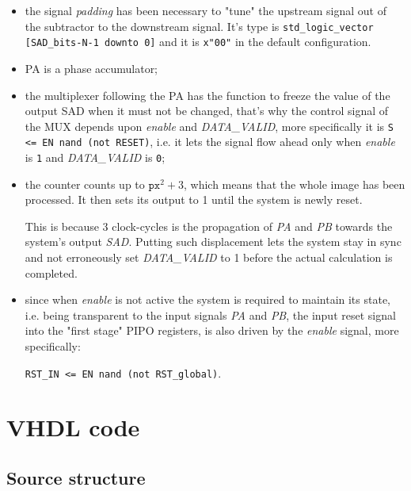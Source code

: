 \documentclass[12pt, a4paper]{article}
\begin{document}
\begin{itemize} 


\item the signal \textit{padding} has been necessary to "tune" the upstream signal out of the subtractor to the downstream signal. It's type is \texttt{std\_logic\_vector [SAD\_bits-N-1 downto 0]} and it is \texttt{x"00"} in the default configuration.

\item PA is a phase accumulator;

\item the multiplexer following the PA has the function to freeze the value of the output SAD when it must not be changed, that's why the control signal of the MUX depends upon \textit{enable} and \textit{DATA\_VALID}, more specifically it is
 \texttt{S <= EN nand (not RESET)}, i.e. it lets the signal flow ahead only when \textit{enable} is \texttt{1} and \textit{DATA\_VALID} is \texttt{0};
 
 \item the counter counts up to $\texttt{px}^2+3$, which means that the whole image has been processed. It then sets its output to 1 until the system is newly reset. 
 
 This is because 3 clock-cycles is the propagation of \textit{PA} and \textit{PB} towards the system's output \textit{SAD}.
 Putting such displacement lets the system stay in sync and not erroneously set \textit{DATA\_VALID} to 1 before the actual calculation is completed.

 
 \item since when \textit{enable} is not active the system is required to maintain its state, i.e. being transparent to the input signals \textit{PA} and \textit{PB}, the input reset signal into the "first stage" PIPO registers, is also driven by the \textit{enable} signal, more specifically:

 \texttt{RST\_IN <= EN nand (not RST\_global)}.
 
 

\end{itemize}



\section{VHDL code}

\subsection{Source structure}
\end{document}
